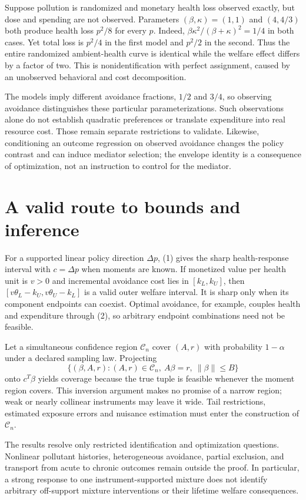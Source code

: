 \documentclass[11pt,a4paper]{article}
\begin{document}
Suppose pollution is randomized and monetary health loss observed exactly, but dose and spending are not observed. Parameters $(\beta,\kappa)=(1,1)$ and $(4,4/3)$ both produce health loss $p^2/8$ for every $p$. Indeed, $\beta\kappa^2/(\beta+\kappa)^2=1/4$ in both cases. Yet total loss is $p^2/4$ in the first model and $p^2/2$ in the second. Thus the entire randomized ambient-health curve is identical while the welfare effect differs by a factor of two. This is nonidentification with perfect assignment, caused by an unobserved behavioral and cost decomposition.

The models imply different avoidance fractions, $1/2$ and $3/4$, so observing avoidance distinguishes these particular parameterizations. Such observations alone do not establish quadratic preferences or translate expenditure into real resource cost. Those remain separate restrictions to validate. Likewise, conditioning an outcome regression on observed avoidance changes the policy contrast and can induce mediator selection; the envelope identity is a consequence of optimization, not an instruction to control for the mediator.

\section{A valid route to bounds and inference}
For a supported linear policy direction $\Delta p$, (1) gives the sharp health-response interval with $c=\Delta p$ when moments are known. If monetized value per health unit is $v>0$ and incremental avoidance cost lies in $[k_L,k_U]$, then $[v\theta_L-k_U,v\theta_U-k_L]$ is a valid outer welfare interval. It is sharp only when its component endpoints can coexist. Optimal avoidance, for example, couples health and expenditure through (2), so arbitrary endpoint combinations need not be feasible.

Let a simultaneous confidence region $\mathcal C_n$ cover $(A,r)$ with probability $1-\alpha$ under a declared sampling law. Projecting
\[
 \{(\beta,A,r):(A,r)\in\mathcal C_n,\ A\beta=r,\ \|\beta\|\le B\}
\]
onto $c^T\beta$ yields coverage because the true tuple is feasible whenever the moment region covers. This inversion argument makes no promise of a narrow region; weak or nearly collinear instruments may leave it wide. Tail restrictions, estimated exposure errors and nuisance estimation must enter the construction of $\mathcal C_n$.

The results resolve only restricted identification and optimization questions. Nonlinear pollutant histories, heterogeneous avoidance, partial exclusion, and transport from acute to chronic outcomes remain outside the proof. In particular, a strong response to one instrument-supported mixture does not identify arbitrary off-support mixture interventions or their lifetime welfare consequences.
\end{document}
